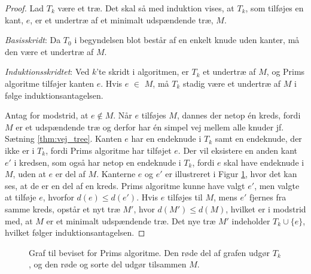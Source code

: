


\begin{proof}
Lad $T_{k}$ være et træ. Det skal så med induktion vises, at $T_{k}$, som tilføjes en kant, $e$, er et undertræ af et minimalt udspændende træ, $M$. 

\textit{Basisskridt}: Da $T_0$ i begyndelsen blot består af en enkelt knude uden kanter, må den være et undertræ af $M$.

\textit{Induktionsskridtet}: Ved $k$'te skridt i algoritmen, er $T_k$ et undertræ af $M$, og Prims algoritme tilføjer kanten $e$. Hvis $e$ $\in$ $M$, må $T_k$ stadig være et undertræ af $M$ i følge induktionsantagelsen.

Antag for modstrid, at $e \notin M$. Når $e$ tilføjes $M$, dannes der netop én kreds, fordi $M$ er et udspændende træ og derfor har én simpel vej mellem alle knuder jf. Sætning \ref{thm:vej_tree}.
Kanten $e$ har en endeknude i $T_k$ samt en endeknude, der ikke er i $T_k$, fordi Prims algoritme har tilføjet $e$. 
Der vil eksistere en anden kant $e'$ i kredsen, som også har netop en endeknude i $T_k$, fordi $e$ skal have endeknude i $M$, uden at $e$ er del af $M$. 
Kanterne $e$ og $e'$ er illustreret i Figur \ref{graf_prim_bevis}, hvor det kan ses, at de er en del af en kreds. 
Prims algoritme kunne have valgt $e'$, men valgte at tilføje $e$, hvorfor $d(e) \leq d(e')$. 
Hvis $e$ tilføjes til $M$, mens $e'$ fjernes fra samme kreds, opstår et nyt træ $M'$, hvor 
$d(M') \leq d(M)$, hvilket er i modstrid med, at $M$ er et minimalt udspændende træ. Det nye træ $M'$ indeholder $T_k\cup \lbrace e \rbrace$, hvilket følger induktionsantagelsen. 
\end{proof}

\begin{figure}[h]
\centering

\caption{Graf til beviset for Prims algoritme. Den røde del af grafen udgør $T_k$, og den røde og sorte del udgør tilsammen $M$.  } 
\label{graf_prim_bevis}
\end{figure}
